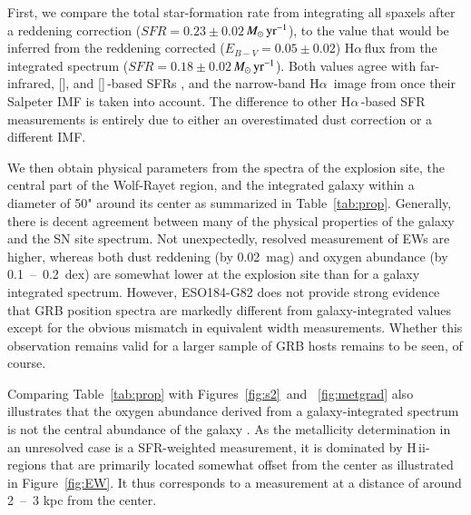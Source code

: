 \documentclass[traditabstract]{aa}
\newcommand{\ha}{H$\alpha$}
\newcommand{\hii}{\mbox{H\,{\sc ii}}}
\newcommand{\oi}{[\ion{O}{i}]}
\newcommand{\cii}{[\ion{C}{ii}]}
\newcommand{\Msunyr}{$M_\odot\,\rm{yr}^{-1}$}
\begin{document}
First, we compare the total star-formation rate from integrating all spaxels after a reddening correction ($SFR=0.23\pm0.02$\,\Msunyr), to the value that would be inferred from the reddening corrected ($E_{B-V}=0.05\pm0.02$) \ha\,flux from the integrated spectrum ($SFR=0.18\pm0.02$\,\Msunyr). Both values agree with far-infrared, \oi, and \cii\,-based SFRs \citep{2014A&A...562A..70M, 2016arXiv160901742M}, and the narrow-band \ha\, image from \citet{2005NewA...11..103S} once their Salpeter IMF is taken into account. The difference to other \ha\,-based SFR measurements \citep{2006A&A...454..103H, 2008A&A...490...45C} is entirely due to either an overestimated dust correction or a different IMF.

We then obtain physical parameters from the spectra of the explosion site, the central part of the Wolf-Rayet region, and the integrated galaxy within a diameter of 50" around its center as summarized in Table~\ref{tab:prop}. Generally, there is decent agreement between many of the physical properties of the galaxy and the SN site spectrum. Not unexpectedly, resolved measurement of EWs are higher, whereas both dust reddening (by 0.02~mag) and oxygen abundance (by 0.1~--~0.2~dex) are somewhat lower at the explosion site than for a galaxy integrated spectrum. However, ESO184-G82 does not provide strong evidence that GRB position spectra are markedly different from galaxy-integrated values except for the obvious mismatch in equivalent width measurements. Whether this observation remains valid for a larger sample of GRB hosts remains to be seen, of course.

Comparing Table~\ref{tab:prop} with Figures~\ref{fig:s2}~and ~\ref{fig:metgrad} also illustrates that the oxygen abundance derived from a galaxy-integrated spectrum is not the central abundance of the galaxy \citep[see also e.g.,][]{2016A&A...591A..48G}. As the metallicity determination in an unresolved case is a SFR-weighted measurement, it is dominated by \hii-regions that are primarily located somewhat offset from the center as illustrated in Figure~\ref{fig:EW}. It thus corresponds to a measurement at a distance of around 2~--~3 kpc from the center. 
\end{document}
